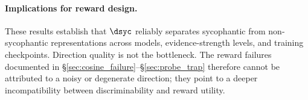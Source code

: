 \paragraph{Implications for reward design.}
These results establish that $\dsyc$ reliably separates sycophantic from non-sycophantic representations across models, evidence-strength levels, and training checkpoints.
Direction quality is not the bottleneck.
The reward failures documented in \S\ref{sec:cosine_failure}--\S\ref{sec:probe_trap} therefore cannot be attributed to a noisy or degenerate direction; they point to a deeper incompatibility between discriminability and reward utility.
